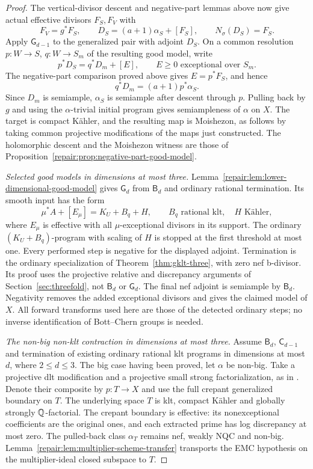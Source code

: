 \begin{proof}
The vertical-divisor descent and negative-part lemmas above now
give actual effective divisors $F_S,F_V$ with
\[
 F_V=g^*F_S,\qquad
 D_S=(a+1)\alpha_S+[F_S],\qquad N_\sigma(D_S)=F_S.
\]
Apply $\mathsf G_{d-1}$ to the generalized pair with adjoint $D_S$.
On a common resolution $p:W\to S$, $q:W\to S_m$ of the resulting
good model, write
\[
 p^*D_S=q^*D_m+[E],\qquad E\geq0
 \text{ exceptional over }S_m.
\]
The negative-part comparison proved above gives
$E=p^*F_S$, and hence
\[
 q^*D_m=(a+1)p^*\alpha_S.
\]
Since $D_m$ is semiample, $\alpha_S$ is semiample after descent
through $p$. Pulling back by $g$ and using the
$\alpha$-trivial initial program gives semiampleness of
$\alpha$ on $X$. The target is compact K\"ahler, and the
resulting map is Moishezon, as follows by taking common projective
modifications of the maps just constructed. The holomorphic descent and the Moishezon witness are those of
Proposition~\ref{repair:prop:negative-part-good-model}.

\smallskip\noindent
\emph{Selected good models in dimensions at most three.}
Lemma~\ref{repair:lem:lower-dimensional-good-model} gives
$\mathsf G_d$ from $\mathsf B_d$ and ordinary rational
termination. Its smooth input has the form
\[
 \mu^*A+[E_\mu]=K_U+B_q+H,
 \qquad B_q\text{ rational klt},\quad H\text{ K\"ahler},
\]
where $E_\mu$ is effective with all $\mu$-exceptional divisors in
its support. The ordinary $(K_U+B_q)$-program with scaling of $H$
is stopped at the first threshold at most one. Every performed
step is negative for the displayed adjoint. Termination is the
ordinary specialization of Theorem~\ref{thm:gklt-three},
with zero nef b-divisor. Its proof uses the projective relative and
discrepancy arguments of Section~\ref{sec:threefold}, not
$\mathsf B_d$ or $\mathsf G_d$.
The final nef adjoint is semiample by $\mathsf B_d$.
Negativity removes the added exceptional divisors and gives the
claimed model of $X$. All forward transforms used here are those
of the detected ordinary steps; no inverse identification of
Bott--Chern groups is needed.

\smallskip\noindent
\emph{The non-big non-klt contraction in dimensions at most three.}
Assume $\mathsf B_d$, $\mathsf C_{d-1}$ and termination of
existing ordinary rational klt programs in dimensions at most $d$,
where $2\leq d\leq3$. The big case having been proved, let
$\alpha$ be non-big. Take a projective dlt modification and a
projective small strong factorialization, as in
\cite[Theorems~2.26 and~2.27]{HX2026}. Denote their composite by
$p:T\to X$ and use the full crepant generalized boundary on $T$.
The underlying space $T$ is klt, compact K\"ahler and globally
strongly $\mathbb Q$-factorial. The crepant boundary is effective:
its nonexceptional coefficients are the original ones, and each
extracted prime has log discrepancy at most zero. The pulled-back
class $\alpha_T$ remains nef, weakly NQC and non-big.
Lemma~\ref{repair:lem:multiplier-scheme-transfer} transports the
EMC hypothesis on the multiplier-ideal closed subspace to $T$.


\end{proof}
